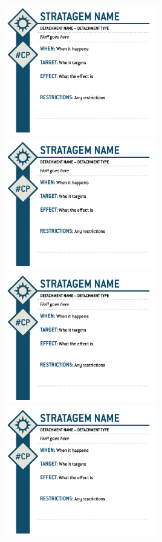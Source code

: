 \documentclass{report}
\begin{document}
\begin{minipage}[t][23.75cm][b]{\textwidth}
\includegraphics[width =0.5\textwidth]{Images/Stratagems/Stratagem_1.png}
\includegraphics[width =0.5\textwidth]{Images/Stratagems/Stratagem_2.png}
\includegraphics[width =0.5\textwidth]{Images/Stratagems/Stratagem_3.png}
\includegraphics[width =0.5\textwidth]{Images/Stratagems/Stratagem_4.png}

\end{minipage}
\end{document}
